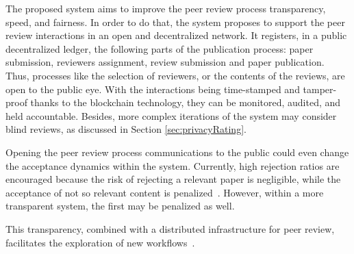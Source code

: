 The proposed system aims to improve the peer review process transparency, speed,
and fairness. In order to do that, the system proposes to support the peer
review interactions in an open and decentralized network. It registers, in a
public decentralized ledger, the following parts of the publication process:
paper submission, reviewers assignment, review submission and paper publication.
Thus, processes like the selection of reviewers, or the contents of the reviews,
are open to the public eye. With the interactions being time-stamped and
tamper-proof thanks to the blockchain technology, they can be monitored,
audited, and held accountable. Besides, more complex iterations of the system
may consider blind reviews, as discussed in Section \ref{sec:privacyRating}.

Opening the peer review process communications to the public could even change
the acceptance dynamics within the system. Currently, high rejection ratios are
encouraged because the risk of rejecting a relevant paper is negligible, while
the acceptance of not so relevant content is
penalized~\cite{ReinventingRigor,garfield2007evolution}. However, within a more
transparent system, the first may be penalized as well.

This transparency, combined with a distributed infrastructure for peer review,
facilitates the exploration of new workflows~\cite{ReinventingSocioTech}.


